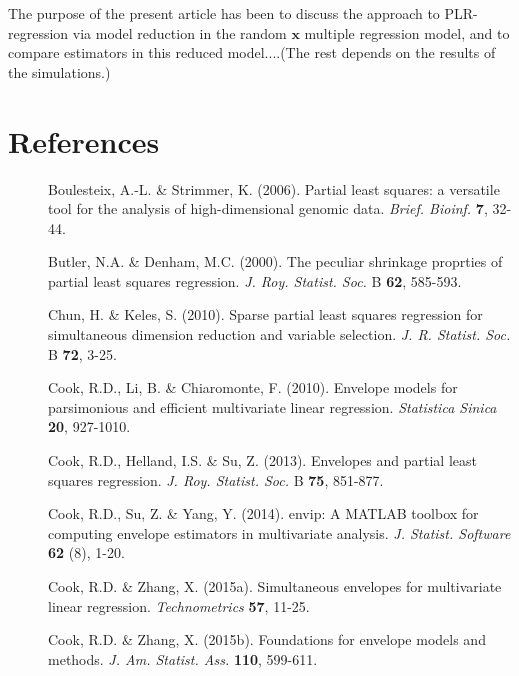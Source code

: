 \documentclass[11pt]{article}
\begin{document}
The purpose of the present article has been to discuss the approach to PLR-regression via model reduction in the random $\bm{x}$ multiple regression model, and to compare estimators in this reduced model....(The rest depends on the results of the simulations.)



\section*{References}
\begin{description}

\item[] Boulesteix, A.-L. \& Strimmer, K. (2006). Partial least squares: a versatile tool for the analysis of high-dimensional genomic data. \textit{Brief. Bioinf.} \textbf{7}, 32-44.

\item[] Butler, N.A. \& Denham, M.C. (2000). The peculiar shrinkage proprties of partial least squares regression. \textit{J. Roy. Statist. Soc.} B \textbf{62}, 585-593.

\item[] Chun, H. \& Keles, S. (2010). Sparse partial least squares regression for simultaneous dimension reduction and variable selection. \textit{J. R. Statist. Soc.} B \textbf{72}, 3-25.

\item[] Cook, R.D., Li, B. \& Chiaromonte, F. (2010). Envelope models for parsimonious and efficient multivariate linear regression. \textit{Statistica Sinica} \textbf{20}, 927-1010.

\item[] Cook, R.D., Helland, I.S. \& Su, Z. (2013). Envelopes and partial least squares regression.  \textit{J. Roy. Statist. Soc.} B \textbf{75}, 851-877.

\item[] Cook, R.D., Su, Z. \& Yang, Y. (2014). envip: A MATLAB toolbox for computing envelope estimators in multivariate analysis. \textit{J. Statist. Software} \textbf{62} (8), 1-20.

\item[] Cook, R.D. \& Zhang, X. (2015a). Simultaneous envelopes for multivariate linear regression. \textit{Technometrics} \textbf{57}, 11-25.

\item[] Cook, R.D. \& Zhang, X. (2015b). Foundations for envelope models and methods. \textit{J. Am. Statist. Ass.} \textbf{110}, 599-611.


\end{description}
\end{document}
